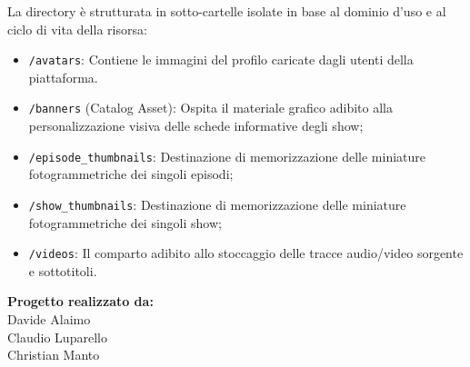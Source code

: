 \documentclass[11pt,a4paper]{article}
\begin{document}
La directory è strutturata in sotto-cartelle isolate in base al dominio d'uso e al ciclo di vita della risorsa:
\begin{itemize}
    \item \texttt{/avatars}: Contiene le immagini del profilo caricate dagli utenti della piattaforma.
    \item \texttt{/banners} (Catalog Asset): Ospita il materiale grafico adibito alla personalizzazione visiva delle schede informative degli show;
    \item \texttt{/episode\_thumbnails}: Destinazione di memorizzazione delle miniature fotogrammetriche dei singoli episodi;
    \item \texttt{/show\_thumbnails}: Destinazione di memorizzazione delle miniature fotogrammetriche dei singoli show;
    \item \texttt{/videos}: Il comparto adibito allo stoccaggio delle tracce audio/video sorgente e sottotitoli.
\end{itemize}

\vspace{1.5cm}
\begin{flushright}
    \textbf{Progetto realizzato da:} \\
    Davide Alaimo \\
    Claudio Luparello \\
    Christian Manto
\end{flushright}
\end{document}
